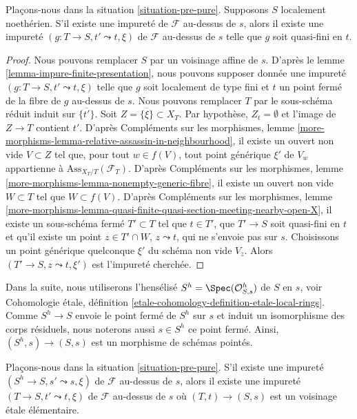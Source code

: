 \begin{lemma}
\label{lemma-Noetherian-impurity-quasi-finite}
Plaçons-nous dans la situation \ref{situation-pre-pure}.
Supposons $S$ localement noethérien.
S'il existe une impureté de $\mathcal{F}$ au-dessus de $s$, alors
il existe une impureté $(g : T \to S, t' \leadsto t, \xi)$
de $\mathcal{F}$ au-dessus de $s$ telle que $g$ soit quasi-fini en $t$.
\end{lemma}

\begin{proof}
Nous pouvons remplacer $S$ par un voisinage affine de $s$. D'après le
lemme \ref{lemma-impure-finite-presentation},
nous pouvons supposer donnée une impureté $(g : T \to S, t' \leadsto t, \xi)$
telle que $g$ soit localement de type fini et $t$ un point fermé de la
fibre de $g$ au-dessus de $s$. Nous pouvons remplacer $T$ par le sous-schéma réduit
induit sur $\overline{\{t'\}}$. Soit
$Z = \overline{\{\xi\}} \subset X_T$. Par hypothèse, $Z_t = \emptyset$
et l'image de $Z \to T$ contient $t'$. D'après
Compléments sur les morphismes,
lemme \ref{more-morphisms-lemma-relative-assassin-in-neighbourhood},
il existe un ouvert non vide $V \subset Z$ tel que, pour tout
$w \in f(V)$, tout point générique $\xi'$ de $V_w$ appartienne à
$\text{Ass}_{X_T/T}(\mathcal{F}_T)$. D'après
Compléments sur les morphismes, lemme \ref{more-morphisms-lemma-nonempty-generic-fibre},
il existe un ouvert non vide $W \subset T$ tel que $W \subset f(V)$. D'après
Compléments sur les morphismes, lemme
\ref{more-morphisms-lemma-quasi-finite-quasi-section-meeting-nearby-open-X},
il existe un sous-schéma fermé $T' \subset T$ tel que
$t \in T'$, que $T' \to S$ soit quasi-fini en $t$ et qu'il existe un point
$z \in T' \cap W$, $z \leadsto t$, qui ne s'envoie pas sur $s$.
Choisissons un point générique quelconque $\xi'$ du schéma non vide $V_z$.
Alors $(T' \to S, z \leadsto t, \xi')$ est l'impureté cherchée.
\end{proof}

\noindent
Dans la suite, nous utiliserons l'hensélisé
$S^h = \Spec(\mathcal{O}_{S, s}^h)$
de $S$ en $s$, voir
Cohomologie \'etale,
définition \ref{etale-cohomology-definition-etale-local-rings}.
Comme $S^h \to S$ envoie le point fermé de $S^h$ sur $s$ et
induit un isomorphisme des corps résiduels, nous noterons
aussi $s \in S^h$ ce point fermé. Ainsi, $(S^h, s) \to (S, s)$ est
un morphisme de schémas pointés.

\begin{lemma}
\label{lemma-impurity-on-henselization}
Plaçons-nous dans la situation \ref{situation-pre-pure}.
S'il existe une impureté $(S^h \to S, s' \leadsto s, \xi)$
de $\mathcal{F}$ au-dessus de $s$, alors il existe une impureté
$(T \to S, t' \leadsto t, \xi)$ de $\mathcal{F}$ au-dessus de $s$
où $(T, t) \to (S, s)$ est un voisinage \'etale élémentaire.
\end{lemma}

